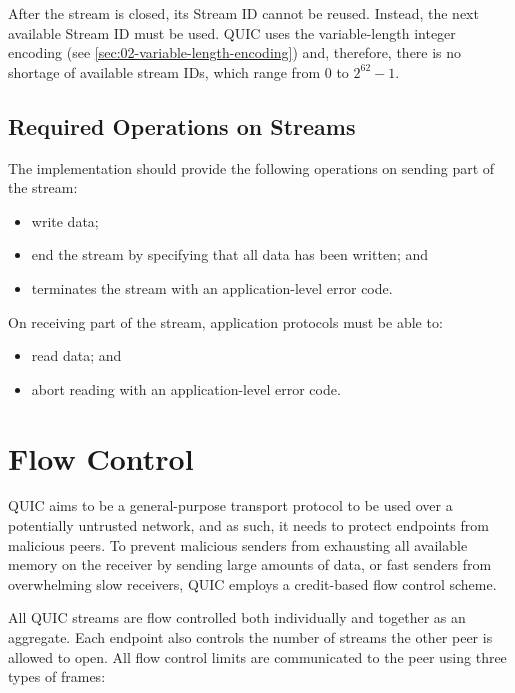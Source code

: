 After the stream is closed, its Stream ID cannot be reused. Instead, the next available Stream ID
must be used. QUIC uses the variable-length integer encoding (see
\autoref{sec:02-variable-length-encoding}) and, therefore, there is no shortage of available stream
IDs, which range from 0 to $2^{62}-1$.

\subsection{Required Operations on Streams}

The implementation should provide the following operations on sending part of the stream:

\begin{itemize}

  \item write data;

  \item end the stream by specifying that all data has been written; and

  \item terminates the stream with an application-level error code.

\end{itemize}

On receiving part of the stream, application protocols must be able to:

\begin{itemize}

  \item read data; and

  \item abort reading with an application-level error code.

\end{itemize}

\section{Flow Control}

QUIC aims to be a general-purpose transport protocol to be used over a potentially untrusted
network, and as such, it needs to protect endpoints from malicious peers. To prevent malicious
senders from exhausting all available memory on the receiver by sending large amounts of data, or
fast senders from overwhelming slow receivers, QUIC employs a credit-based flow control scheme.

All QUIC streams are flow controlled both individually and together as an aggregate. Each endpoint
also controls the number of streams the other peer is allowed to open. All flow control limits are
communicated to the peer using three types of frames:

